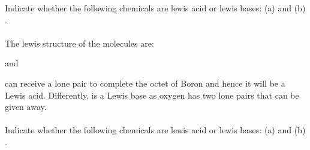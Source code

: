 \documentclass[main.tex]{subfiles}
\begin{document}
\begin{description}
\begin{example} %
Indicate whether the following chemicals are lewis acid or lewis bases: (a)  and (b) .
\\
\\
The lewis structure of the molecules are:
\begin{center}
\hspace{.05in}   \hspace{.05in}and\hspace{.05in} 
\end{center}
 can receive a lone pair to complete the octet of Boron and hence it will be a Lewis acid. Differently,  is a Lewis base as oxygen has two lone pairs that can be given away.\\
\faDiamond\ \\
Indicate whether the following chemicals are lewis acid or lewis bases: (a)  and (b) .
\end{example}%
\end{description}
\end{document}
